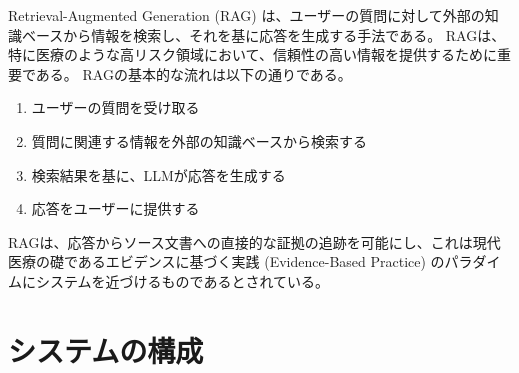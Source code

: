 \documentclass[12pt,a4paper]{jsarticle}
\begin{document}
Retrieval-Augmented Generation (RAG) は、ユーザーの質問に対して外部の知識ベースから情報を検索し、それを基に応答を生成する手法である。
RAGは、特に医療のような高リスク領域において、信頼性の高い情報を提供するために重要である。
RAGの基本的な流れは以下の通りである。
\begin{enumerate}
	\item ユーザーの質問を受け取る
	\item 質問に関連する情報を外部の知識ベースから検索する
	\item 検索結果を基に、LLMが応答を生成する
	\item 応答をユーザーに提供する
\end{enumerate}
RAGは、応答からソース文書への直接的な証拠の追跡を可能にし、これは現代医療の礎であるエビデンスに基づく実践 (Evidence-Based Practice) のパラダイムにシステムを近づけるものであるとされている。

\section{システムの構成}
\label{sec:ex3}
\end{document}
